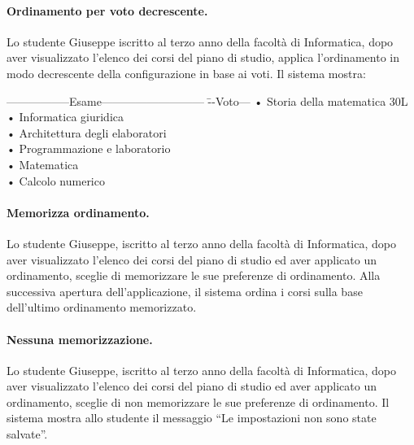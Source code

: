 \paragraph{Ordinamento per voto decrescente.}
Lo studente Giuseppe iscritto al terzo anno della facoltà di Informatica, dopo aver visualizzato l'elenco dei corsi del piano di studio, applica l'ordinamento in modo decrescente della configurazione in base ai voti. Il sistema mostra:

 \begin{tabbing}
	\hspace{1cm}-----------------Esame--------------------------- \= --Voto--- \kill
	\hspace{1cm} • Storia della matematica \> 30L \\
	\hspace{1cm} • Informatica giuridica   \\
	\hspace{1cm} • Architettura degli elaboratori   \\
	\hspace{1cm} • Programmazione e laboratorio  \\
	\hspace{1cm} • Matematica   \\
	\hspace{1cm} • Calcolo numerico   \\
\end{tabbing}

\paragraph{Memorizza ordinamento.}
Lo studente Giuseppe, iscritto al terzo anno della facoltà di Informatica, dopo aver visualizzato l’elenco dei corsi del piano di studio ed aver applicato un ordinamento, sceglie di memorizzare le sue preferenze di ordinamento. Alla successiva apertura dell’applicazione, il sistema ordina i corsi sulla base dell'ultimo ordinamento memorizzato.

\paragraph{Nessuna memorizzazione.}
Lo studente Giuseppe, iscritto al terzo anno della facoltà di Informatica, dopo aver visualizzato l’elenco dei corsi del piano di studio ed aver applicato un ordinamento, sceglie di non memorizzare le sue preferenze di ordinamento. Il sistema mostra allo studente il messaggio “Le impostazioni non sono state salvate”. 

